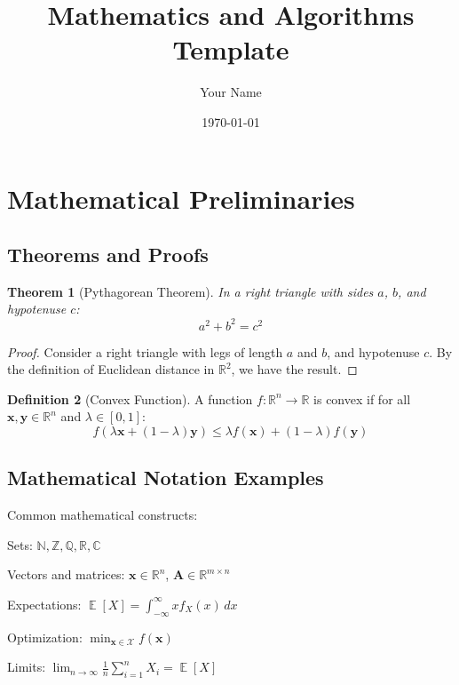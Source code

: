\documentclass[12pt]{article}
\title{Mathematics and Algorithms Template}
\author{Your Name}
\date{\today}
\newtheorem{theorem}{Theorem}[section]
\theoremstyle{definition}
\newtheorem{definition}[theorem]{Definition}
\theoremstyle{remark}
\DeclareMathOperator{\E}{\mathbb{E}}
\begin{document}
\maketitle

\section{Mathematical Preliminaries}

\subsection{Theorems and Proofs}

\begin{theorem}[Pythagorean Theorem]
In a right triangle with sides $a$, $b$, and hypotenuse $c$:
\[
a^2 + b^2 = c^2
\]
\end{theorem}

\begin{proof}
Consider a right triangle with legs of length $a$ and $b$, and hypotenuse $c$. 
By the definition of Euclidean distance in $\mathbb{R}^2$, we have the result.
\end{proof}

\begin{definition}[Convex Function]
A function $f: \mathbb{R}^n \to \mathbb{R}$ is convex if for all 
$\mathbf{x}, \mathbf{y} \in \mathbb{R}^n$ and $\lambda \in [0,1]$:
\[
f(\lambda \mathbf{x} + (1-\lambda) \mathbf{y}) \leq \lambda f(\mathbf{x}) + (1-\lambda) f(\mathbf{y})
\]
\end{definition}

\subsection{Mathematical Notation Examples}

Common mathematical constructs:

\item Sets: $\mathbb{N}, \mathbb{Z}, \mathbb{Q}, \mathbb{R}, \mathbb{C}$
    \item Vectors and matrices: $\mathbf{x} \in \mathbb{R}^n$, $\mathbf{A} \in \mathbb{R}^{m \times n}$
    \item Expectations: $\E[X] = \int_{-\infty}^{\infty} x f_X(x) \, dx$
    \item Optimization: $\min_{\mathbf{x} \in \mathcal{X}} f(\mathbf{x})$
    \item Limits: $\lim_{n \to \infty} \frac{1}{n} \sum_{i=1}^n X_i = \E[X]$
\end{document}
